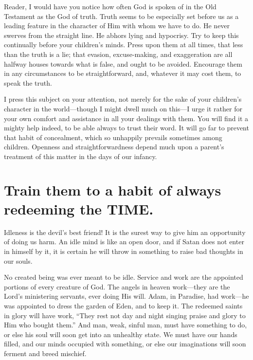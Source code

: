 \documentclass[
]{book}
\begin{document}
Reader, I would have you notice how often God is spoken of in the Old Testament as the God of truth. Truth seems to be especially set before us as a leading feature in the character of Him with whom we have to do. He never swerves from the straight line. He abhors lying and hypocrisy. Try to keep this continually before your children's minds. Press upon them at all times, that less than the truth is a lie; that evasion, excuse-making, and exaggeration are all halfway houses towards what is false, and ought to be avoided. Encourage them in any circumstances to be straightforward, and, whatever it may cost them, to speak the truth.

I press this subject on your attention, not merely for the sake of your children's character in the world---though I might dwell much on this---I urge it rather for your own comfort and assistance in all your dealings with them. You will find it a mighty help indeed, to be able always to trust their word. It will go far to prevent that habit of concealment, which so unhappily prevails sometimes among children. Openness and straightforwardness depend much upon a parent's treatment of this matter in the days of our infancy.

\hypertarget{train-them-to-a-habit-of-always-redeeming-the-time.}{%
\chapter{Train them to a habit of always redeeming the TIME.}\label{train-them-to-a-habit-of-always-redeeming-the-time.}}

Idleness is the devil's best friend! It is the surest way to give him an opportunity of doing us harm. An idle mind is like an open door, and if Satan does not enter in himself by it, it is certain he will throw in something to raise bad thoughts in our souls.

No created being was ever meant to be idle. Service and work are the appointed portions of every creature of God. The angels in heaven work---they are the Lord's ministering servants, ever doing His will. Adam, in Paradise, had work---he was appointed to dress the garden of Eden, and to keep it. The redeemed saints in glory will have work, ``They rest not day and night singing praise and glory to Him who bought them.'' And man, weak, sinful man, must have something to do, or else his soul will soon get into an unhealthy state. We must have our hands filled, and our minds occupied with something, or else our imaginations will soon ferment and breed mischief.
\end{document}
